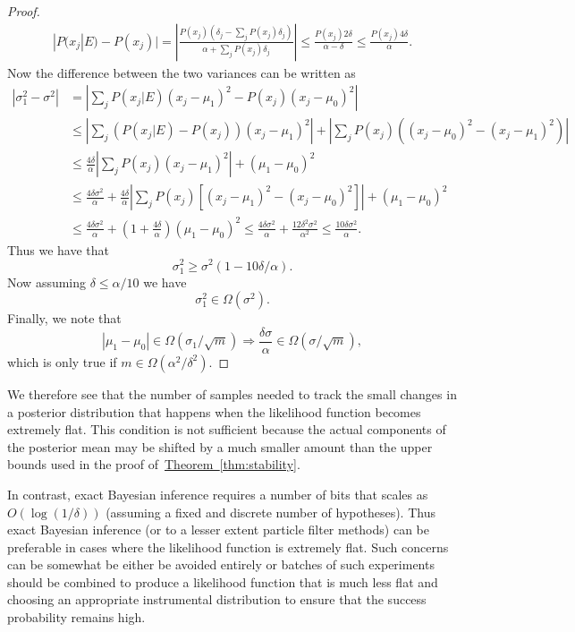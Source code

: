 \documentclass[aps,pra,amsmath,twocolumn,amssymb,superscriptaddress]{revtex4-1}
\newcommand{\thm}[1]{\hyperref[thm:#1]{Theorem~\ref*{thm:#1}}}
\begin{document}
\begin{proof}
\begin{align}
|P(x_j|E)-P(x_j)| = \left|\frac{P(x_j)(\delta_j-\sum_jP(x_j)\delta_j)}{\alpha+\sum_j P(x_j)\delta_j}\right|\le \frac{P(x_j) 2\delta}{\alpha-\delta}\le \frac{P(x_j) 4\delta}{\alpha}.
\end{align}
Now the difference between the two variances can be written as
\begin{align}
|\sigma_1^2-\sigma^2| &= \left|\sum_j  P(x_j|E)(x_j-\mu_1)^2-P(x_j)(x_j-\mu_0)^2\right|\nonumber\\
 &\le \left|\sum_j  (P(x_j|E)-P(x_j))(x_j-\mu_1)^2\right|+\left|\sum_j P(x_j)\left((x_j-\mu_0)^2-(x_j-\mu_1)^2\right)\right|\nonumber\\
 &\le  \frac{4\delta}{\alpha}\left|\sum_j  P(x_j)(x_j-\mu_1)^2\right|+(\mu_1-\mu_0)^2\nonumber\\
&\le \frac{4\delta\sigma^2}{\alpha}+\frac{4\delta}{\alpha}\left|\sum_j P(x_j)[(x_j-\mu_1)^2-(x_j-\mu_0)^2]  \right|+(\mu_1-\mu_0)^2\nonumber\\
&\le \frac{4\delta\sigma^2}{\alpha}+(1+\frac{4\delta}{\alpha})(\mu_1-\mu_0)^2\le \frac{4\delta\sigma^2}{\alpha}+ \frac{12\delta^2\sigma^2}{\alpha^2}\le \frac{10\delta\sigma^2}{\alpha}.
\end{align}
Thus we have that
\begin{equation}
\sigma_1^2 \ge \sigma^2(1-10\delta/\alpha).
\end{equation}
Now assuming $\delta\le \alpha/10$ we have 
\begin{equation}
\sigma_1^2\in \Omega(\sigma^2).
\end{equation}
Finally, we note that
\begin{equation}
|\mu_1-\mu_0| \in \Omega(\sigma_1/\sqrt{m}) \Rightarrow \frac{\delta \sigma}{\alpha} \in \Omega(\sigma/\sqrt{m}),
\end{equation}
which is only true if $m\in \Omega(\alpha^2/\delta^2)$.
\end{proof}
We therefore see that the number of samples needed to track the small changes in a posterior distribution that happens when the likelihood function becomes extremely flat.  This condition is not sufficient because the actual components of the posterior mean may be shifted by a much smaller amount than the upper bounds used in the proof of~\thm{stability}.

In contrast, exact Bayesian inference requires a number of bits that scales as $O(\log(1/\delta))$ (assuming a fixed and discrete number of hypotheses).  Thus exact Bayesian inference (or to a lesser extent particle filter methods) can be preferable in cases where the likelihood function is extremely flat.  Such concerns can be somewhat be either be avoided entirely or batches of such experiments should be combined to produce a likelihood function that is much less flat and choosing an appropriate instrumental distribution to ensure that the success probability remains high.
\end{document}
